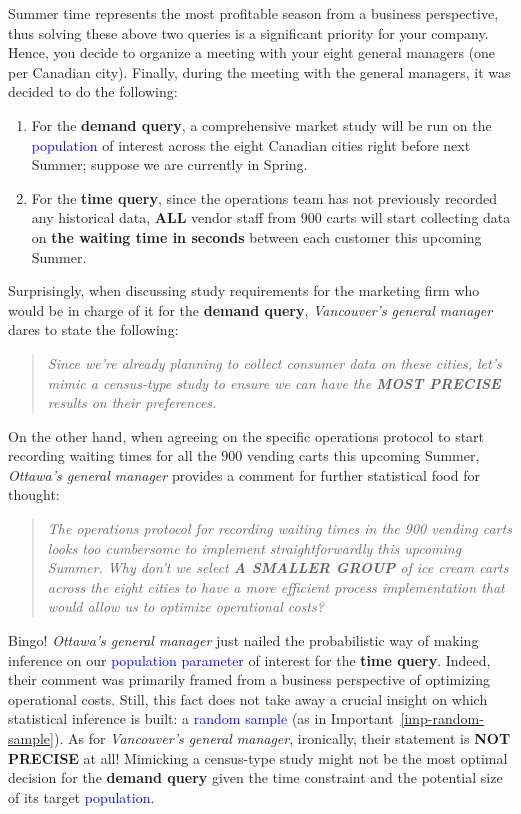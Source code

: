 \documentclass[
  letterpaper,
  DIV=11,
  numbers=noendperiod]{scrreprt}
\providecommand{\tightlist}{%
  \setlength{\itemsep}{0pt}\setlength{\parskip}{0pt}}\usepackage{longtable,booktabs,array}
\begin{document}
Summer time represents the most profitable season from a business
perspective, thus solving these above two queries is a significant
priority for your company. Hence, you decide to organize a meeting with
your eight general managers (one per Canadian city). Finally, during the
meeting with the general managers, it was decided to do the following:

\begin{enumerate}
\def\labelenumi{\arabic{enumi}.}
\tightlist
\item
  For the \textbf{demand query}, a comprehensive market study will be
  run on the \textcolor{blue}{population} of interest across the eight
  Canadian cities right before next Summer; suppose we are currently in
  Spring.
\item
  For the \textbf{time query}, since the operations team has not
  previously recorded any historical data, \textbf{ALL} vendor staff
  from 900 carts will start collecting data on \textbf{the waiting time
  in seconds} between each customer this upcoming Summer.
\end{enumerate}

Surprisingly, when discussing study requirements for the marketing firm
who would be in charge of it for the \textbf{demand query},
\emph{Vancouver's general manager} dares to state the following:

\begin{quote}
\emph{Since we're already planning to collect consumer data on these
cities, let's mimic a census-type study to ensure we can have the
\textbf{MOST PRECISE} results on their preferences.}
\end{quote}

On the other hand, when agreeing on the specific operations protocol to
start recording waiting times for all the 900 vending carts this
upcoming Summer, \emph{Ottawa's general manager} provides a comment for
further statistical food for thought:

\begin{quote}
\emph{The operations protocol for recording waiting times in the 900
vending carts looks too cumbersome to implement straightforwardly this
upcoming Summer. Why don't we select \textbf{A SMALLER GROUP} of ice
cream carts across the eight cities to have a more efficient process
implementation that would allow us to optimize operational costs?}
\end{quote}

Bingo! \emph{Ottawa's general manager} just nailed the probabilistic way
of making inference on our \textcolor{blue}{population parameter} of
interest for the \textbf{time query}. Indeed, their comment was
primarily framed from a business perspective of optimizing operational
costs. Still, this fact does not take away a crucial insight on which
statistical inference is built: a \textcolor{blue}{random sample} (as in
Important~\ref{imp-random-sample}). As for \emph{Vancouver's general
manager}, ironically, their statement is \textbf{NOT PRECISE} at all!
Mimicking a census-type study might not be the most optimal decision for
the \textbf{demand query} given the time constraint and the potential
size of its target \textcolor{blue}{population}.
\end{document}
